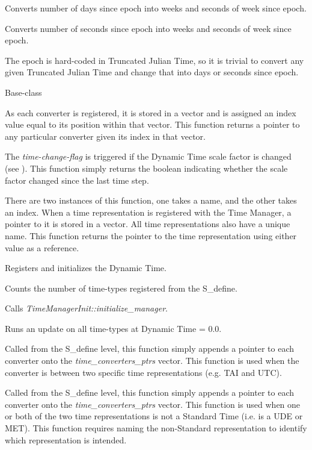 {\begin{enumerate}
{\begin{enumerate}
Converts number of days since epoch into weeks and seconds of week since
epoch.

Converts number of seconds since epoch into weeks and seconds of week
since epoch.

The epoch is hard-coded in Truncated Julian Time, so it is trivial to
convert any given Truncated Julian Time and change that into days or
seconds since epoch.

\end{enumerate}}
 Base-class


{\begin{enumerate}
As each converter is registered, it is stored in a vector and is assigned an
index value equal to its position within that vector.  
This function returns a pointer to any particular
converter given its index in that vector.

The \textit{time-change-flag} is triggered if the Dynamic Time scale
factor is changed (see ).  
This function simply returns
the boolean indicating whether the scale factor changed since the last
time step.

There are two instances of this function, one takes a name, and the
other takes an index.  When a time representation is registered with
the Time Manager, a pointer to it is stored in a vector.  All time
representations also have a unique name.  This function returns the
pointer to the time representation using either value as a reference.

Registers and initializes the Dynamic Time.

Counts the number of time-types registered from the S\_define.

Calls \textit{TimeManagerInit::initialize\_manager}.

Runs an update on all time-types at Dynamic Time = 0.0.

Called from the S\_define level, this function simply appends a pointer to
each converter onto the \textit{time\_converters\_ptrs}
vector.  This function is used when the converter is between two
specific time representations (e.g. TAI and UTC).

Called from the S\_define level, this function simply appends a pointer to
each converter onto the \textit{time\_converters\_ptrs}
vector.  This function is used when one or both of the two time
representations is not a Standard Time (i.e. is a UDE or MET).  This
function requires naming the non-Standard representation to identify
which representation is intended.


\end{enumerate}}
\end{enumerate}}
